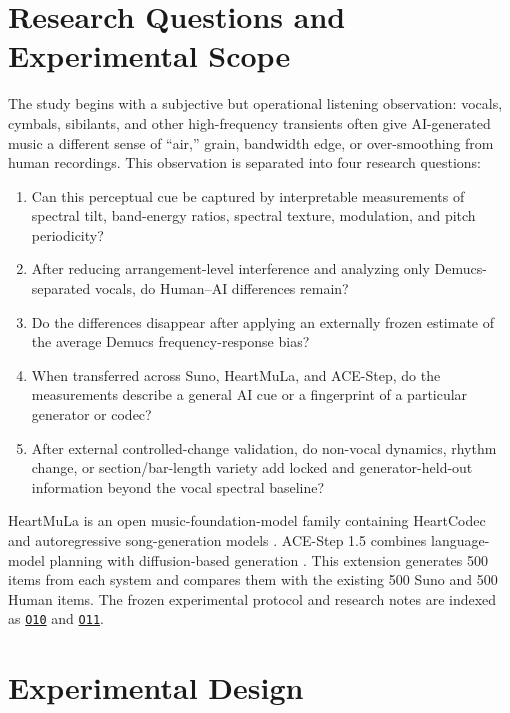 \documentclass[11pt,a4paper]{article}
\newcommand{\outref}[1]{\hyperlink{output:#1}{\texttt{#1}}}
\begin{document}
\tableofcontents
\listoffigures
\listoftables
\clearpage

\section{Research Questions and Experimental Scope}
\label{sec:scope}

The study begins with a subjective but operational listening observation: vocals, cymbals, sibilants, and other high-frequency transients often give AI-generated music a different sense of ``air,'' grain, bandwidth edge, or over-smoothing from human recordings. This observation is separated into four research questions:

\begin{enumerate}
  \item Can this perceptual cue be captured by interpretable measurements of spectral tilt, band-energy ratios, spectral texture, modulation, and pitch periodicity?
  \item After reducing arrangement-level interference and analyzing only Demucs-separated vocals, do Human--AI differences remain?
  \item Do the differences disappear after applying an externally frozen estimate of the average Demucs frequency-response bias?
  \item When transferred across Suno, HeartMuLa, and ACE-Step, do the measurements describe a general AI cue or a fingerprint of a particular generator or codec?
  \item After external controlled-change validation, do non-vocal dynamics, rhythm change, or section/bar-length variety add locked and generator-held-out information beyond the vocal spectral baseline?
\end{enumerate}

HeartMuLa is an open music-foundation-model family containing HeartCodec and autoregressive song-generation models \citep{heartmula2026,heartlib2026}. ACE-Step 1.5 combines language-model planning with diffusion-based generation \citep{acestep2026,acestepcode2026}. This extension generates 500 items from each system and compares them with the existing 500 Suno and 500 Human items. The frozen experimental protocol and research notes are indexed as \outref{O10} and \outref{O11}.

\section{Experimental Design}
\label{sec:design}
\end{document}

